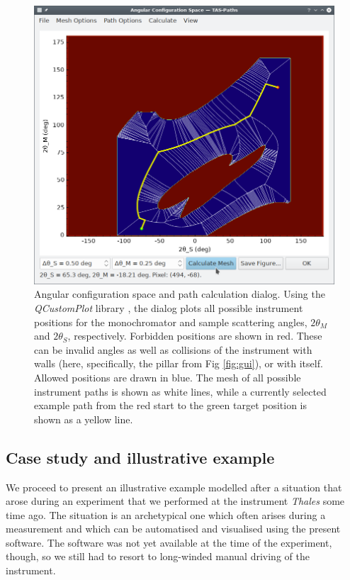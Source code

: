\begin{figure}[htb]
		\begin{center}
			\includegraphics[width = 0.75 \textwidth]{figures/gui_configspace}
		\end{center}
	\caption[Configuration space dialog.]{Angular configuration space and path calculation dialog.
	Using the \textit{QCustomPlot} library \cite{web_QCustomPlot}, the dialog plots all possible
	instrument positions for the monochromator and sample scattering angles, $2\theta_M$ and $2\theta_S$, respectively.
	Forbidden positions are shown in red.
	These can be invalid angles as well as collisions of the instrument with walls
	(here, specifically, the pillar from Fig \ref{fig:gui}), or with itself.
	Allowed positions are drawn in blue. The mesh of all possible instrument
	paths is shown as white lines, while a currently selected example path from
	the red start to the green target position is shown as a yellow line.
		\label{fig:gui_configspace}}
\end{figure}


\subsection{Case study and illustrative example}
We proceed to present an illustrative example modelled after a situation that arose during an 
experiment that we performed at the instrument \textit{Thales} \cite{thales} some time ago. 
The situation is an archetypical one which often arises during a measurement and which
can be automatised and visualised using the present software.
The software was not yet available at the time of the experiment, though, so we still had to resort 
to long-winded manual driving of the instrument.

